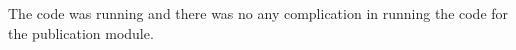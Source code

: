 The code was running and there was no any complication in running the code for the publication module.